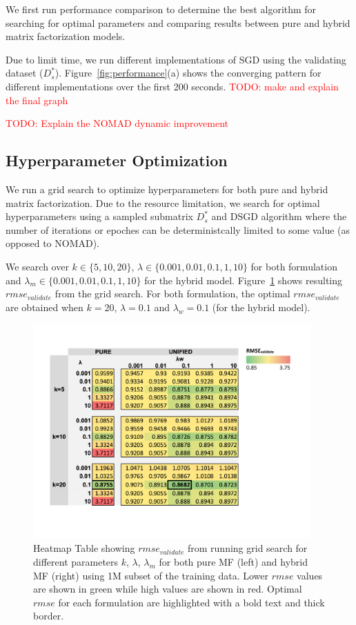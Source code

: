 \documentclass{article} %
\newcommand{\todo}[1]{\textcolor{red}{TODO: #1}}
\begin{document}
We first run performance comparison to determine the best algorithm for
searching for optimal parameters and comparing results  between pure and
hybrid matrix factorization models.

Due to limit time, we run different implementations of SGD using the
validating dataset ($D_s^*$).  Figure~\ref{fig:performance}(a) shows the
converging pattern for different implementations over the first 200 seconds.
\todo{make and explain the final graph}

\todo{Explain the NOMAD dynamic improvement }

\subsection{Hyperparameter Optimization}

We run a grid search to optimize hyperparameters for both pure and hybrid
matrix factorization. Due to the resource limitation, we search for optimal
hyperparameters using a sampled submatrix $D_s^*$ and DSGD algorithm where the
number of iterations or epoches can be deterministcally limited to some value
(as opposed to NOMAD).

We search over $k \in \{5, 10, 20\}$, $\lambda \in \{
0.001, 0.01, 0.1, 1, 10\}$ for both formulation and $\lambda_m \in \{
0.001, 0.01, 0.1, 1, 10\}$ for the hybrid model.  Figure~\ref{fig:gridsearch} shows resulting $rmse_{validate}$ from the grid search.  For both formulation, the optimal $rmse_{validate}$ are obtained when
$k=20$, $\lambda=0.1$ and $\lambda_w=0.1$ (for the hybrid model).

\begin{figure}[h]
\centering
\includegraphics[width=4.2in]{figures/grid}
\caption{\label{fig:gridsearch} Heatmap Table showing $rmse_{validate}$ from
running grid search for different parameters $k$, $\lambda$, $\lambda_m$ for
both pure MF (left) and hybrid MF (right) using 1M subset of the training data.  Lower $rmse$
values are shown in green while high values are shown in red.  Optimal $rmse$
for each formulation are highlighted with a bold text and thick border.}
\end{figure}
\end{document}
